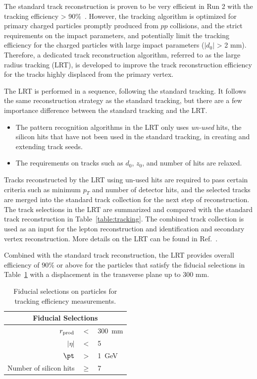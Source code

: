 The standard track reconstruction is proven to be very efficient in Run 2 with the tracking efficiency > 90\%~\cite{Aaboud:2017all}. However, the tracking algorithm is optimized for primary charged particles promptly produced from $pp$ collisions, and the strict requirements on the impact parameters, \dzero and \zzero potentially limit the tracking efficiency for the charged particles with large impact parameters ($|d_{0}|$ > 2 mm). Therefore, a dedicated track reconstruction algorithm, referred to as the large radius tracking (LRT), is developed to improve the track reconstruction efficiency for the tracks highly displaced from the primary vertex.

The LRT is performed in a sequence, following the standard tracking. It follows the same reconstruction strategy as the standard tracking, but there are a few importance difference between the standard tracking and the LRT.

\begin{itemize}
	\item The pattern recognition algorithms in the LRT only uses \textit{un-used} hits, the silicon hits that have not been used in the standard tracking, in creating and extending track seeds.
	\item The requirements on tracks such as $d_{0}$, $z_{0}$, and number of hits are relaxed.
\end{itemize}

Tracks reconstructed by the LRT using un-used hits are required to pass certain criteria such as minimum $p_{T}$ and number of detector hits, and the selected tracks are merged into the standard track collection for the next step of reconstruction. The track selections in the LRT are summarized and compared with the standard track reconstruction in Table~\ref{table:tracking}. The combined track collection is used as an input for the lepton reconstruction and identification and secondary vertex reconstruction. More details on the LRT can be found in Ref.~\cite{ATL-PHYS-PUB-2017-014}.

Combined with the standard track reconstruction, the LRT provides overall efficiency of $90\%$ or above for the particles that satisfy the fiducial selections in Table~\ref{table:TechEffTable} with a displacement in the transverse plane up to 300 \si{\milli\meter}.

\begin{table}[!htb]
\centering
\begin{tabular}{ r c l }
 \hline
 \hline
  \multicolumn{3}{c}{Fiducial Selections}  \\
 \hline
 $r_{\rm prod}$ & $<$ & 300~mm \\
$|\eta|$ & $<$ & 5 \\
 $\pt$ & $>$ & 1~GeV  \\
 Number of silicon hits & $\ge$ & 7  \\
\hline
\hline
\end{tabular}
\caption{Fiducial selections on particles for tracking efficiency measurements.}
\label{table:TechEffTable}
\end{table}


